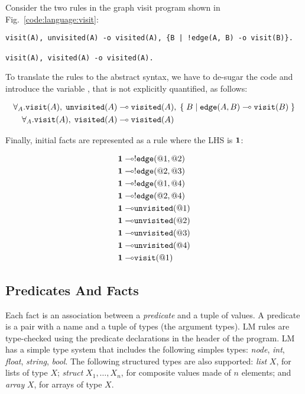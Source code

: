 Consider the two rules in the graph visit program shown in
Fig.~\ref{code:language:visit}:

\nopagebreak

\begin{Verbatim}[fontsize=\codesize]
visit(A), unvisited(A) -o visited(A), {B | !edge(A, B) -o visit(B)}.

visit(A), visited(A) -o visited(A).
\end{Verbatim}

To translate the rules to the abstract syntax, we have to de-sugar the code and
introduce the variable , that is not explicitly quantified, as follows:

\nopagebreak

\begin{align}
\forall_A. \mathtt{visit}(A), \; \mathtt{unvisited}(A) \multimap & \;
\mathtt{visited}(A), \; \{ \; B \; | \; \mathtt{edge}(A, B) \multimap \mathtt{visit}(B) \; \}\\
\forall_A. \mathtt{visit}(A), \; \mathtt{visited}(A) \multimap & \;
\mathtt{visited}(A)
\end{align}

Finally, initial facts are represented as a rule where the LHS is $\mathbf{1}$:

\nopagebreak

\begin{align}
\mathbf{1} \multimap & {!} \mathtt{edge}(@1, @2) \\
\mathbf{1} \multimap & {!} \mathtt{edge}(@2, @3) \\
\mathbf{1} \multimap & {!} \mathtt{edge}(@1, @4) \\
\mathbf{1} \multimap & {!} \mathtt{edge}(@2, @4) \\
\mathbf{1} \multimap & \mathtt{unvisited}(@1)  \\
\mathbf{1} \multimap & \mathtt{unvisited}(@2) \\
\mathbf{1} \multimap & \mathtt{unvisited}(@3) \\
\mathbf{1} \multimap & \mathtt{unvisited}(@4) \\
\mathbf{1} \multimap & \mathtt{visit}(@1)
\end{align}

\subsection{Predicates And Facts}

Each fact is an association between a \emph{predicate} and a tuple of values. A
predicate is a pair with a name and a tuple of types (the argument types). LM
rules are type-checked using the predicate declarations in the header of the
program. LM has a simple type system that includes the following simples types:
\emph{node}, \emph{int}, \emph{float}, \emph{string}, \emph{bool}. The following
structured types are also supported: \emph{list} $X$, for lists of type $X$;
\emph{struct} $X_1, \ldots, X_n$, for composite values made of $n$ elements; and
\emph{array} $X$, for arrays of type $X$.

